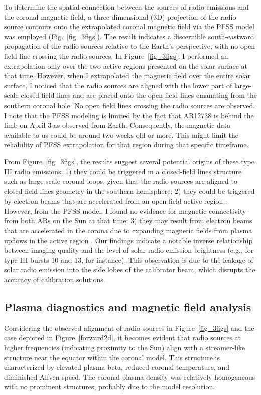 To determine the spatial connection between the sources of radio emissions and the coronal magnetic field, a three-dimensional (3D) projection of the radio source contours onto the extrapolated coronal magnetic field via the PFSS model was employed (Fig.~\ref{fig_3figs}). The result indicates a discernible south-eastward propagation of the radio sources relative to the Earth's perspective, with no open field line crossing the radio sources. In Figure~\ref{fig_3figs}, I performed an extrapolation only over the two active regions presented on the solar surface at that time. However, when I extrapolated the magnetic field over the entire solar surface, I noticed that the radio sources are aligned with the lower part of large-scale closed field lines and are placed onto the open field lines emanating from the southern coronal hole. No open field lines crossing the radio sources are observed.
I note that the PFSS modeling is limited by the fact that AR12738 is behind the limb on April 3 as observed from Earth. Consequently, the magnetic data available to us could be around two weeks old or more. This might limit the reliability of PFSS extrapolation for that region during that specific timeframe.

From Figure~\ref{fig_3figs}, the results suggest several potential origins of these type III radio emissions: 1) they could be triggered in a closed-field lines structure such as large-scale coronal loops, given that the radio sources are aligned to closed-field lines geometry in the southern hemisphere; 2) they could be triggered by electron beams that are accelerated from an open-field active region \citep{kong_2018}. However, from the PFSS model, I found no evidence for magnetic connectivity from both ARs on the Sun at that time; 3) they may result from electron beams that are accelerated in the corona due to expanding magnetic fields from plasma upflows in the active region \citep{del_2011, harra_2021}.
Our findings indicate a notable inverse relationship between imaging quality and the level of solar radio emission brightness (e.g., for type III bursts 10 and 13, for instance). This observation is due to the leakage of solar radio emission into the side lobes of the calibrator beam, which disrupts the accuracy of calibration solutions.

\subsection{Plasma diagnostics and magnetic field analysis}
Considering the observed alignment of radio sources in Figure~\ref{fig_3figs} and the case depicted in Figure~\ref{forward2d}, it becomes evident that radio sources at higher frequencies (indicating proximity to the Sun) align with a streamer-like structure near the equator within the coronal model. This structure is characterized by elevated plasma beta, reduced coronal temperature, and diminished Alfven speed.
The coronal plasma density was relatively homogeneous with no prominent structures, probably due to the model resolution.

